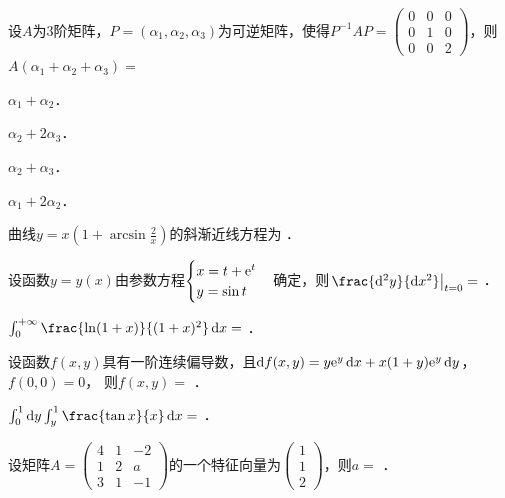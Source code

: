 \documentclass[plain,noanswer,medmath]{../../template/jnuexam}
\begin{document}


\begin{problem}
设$A$为$3$阶矩阵，$P = (\alpha_1,\alpha_2,\alpha_3)$为可逆矩阵，使得$P^{-1} AP = \begin{pmatrix}
  0 & 0 & 0 \\
  0 & 1 & 0 \\
  0 & 0 & 2
\end{pmatrix}$，则$A(\alpha_1 + \alpha_2 + \alpha_3) =$\pickout{}
\begin{abcd}
\item $\alpha_1 + \alpha_2$．
\item $\alpha_2 + 2\alpha_3$．
\item $\alpha_2 + \alpha_3$．
\item $\alpha_1 + 2\alpha_2$．
\end{abcd}
\end{problem}






\begin{problem}
曲线$y = x\left(1 + \arcsin \frac{2}{x} \right)$的斜渐近线方程为 \fillin{}．
\end{problem}


\begin{problem}
设函数$y = y(x)$由参数方程$\begin{cases}
  x = t + \mathrm{e}^t \\
  y = \sin t
\end{cases}$确定，则$\left.\frac{\d^2y}{\dx^2}\right|_{t=0} =$ \fillin{}．
\end{problem}


\begin{problem}
$\int_0^{+\infty} \frac{\ln(1 + x)}{(1 + x)^2}\dx =$ \fillin{}．
\end{problem}


\begin{problem}
设函数$f(x,y)$具有一阶连续偏导数，且$\d f(x,y) = y\e^y \dx + x(1 + y) \e^y \dy$，$f(0,0) = 0$，
则$f(x,y)=$ \fillin{}．
\end{problem}


\begin{problem}
$\int_0^1 \dy \int_y^1 \frac{\tan x}{x}\dx =$ \fillin{}．
\end{problem}


\begin{problem}
设矩阵$A = \begin{pmatrix}
  4 & 1 & -2 \\
  1 & 2 & a \\
  3 & 1 & -1
\end{pmatrix}$的一个特征向量为$\begin{pmatrix}
  1 \\
  1 \\
  2
\end{pmatrix}$，则$a =$ \fillin{}．
\end{problem}
\end{document}
